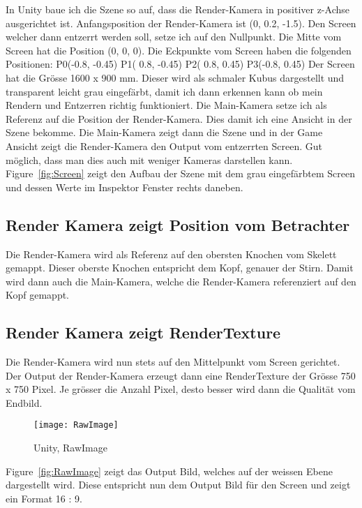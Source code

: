 In Unity baue ich die Szene so auf, dass die Render-Kamera in positiver z-Achse ausgerichtet ist. Anfangsposition der Render-Kamera ist (0, 0.2, -1.5). Den Screen welcher dann entzerrt werden soll, setze ich auf den Nullpunkt. Die Mitte vom Screen hat die Position (0, 0, 0).
Die Eckpunkte vom Screen haben die folgenden Positionen: 
P0(-0.8, -0.45)
P1( 0.8, -0.45)
P2( 0.8,  0.45)
P3(-0.8,  0.45)
Der Screen hat die Grösse 1600 x 900 mm. Dieser wird als schmaler Kubus dargestellt und transparent leicht grau eingefärbt, damit ich dann erkennen kann ob mein Rendern und Entzerren richtig funktioniert.
Die Main-Kamera setze ich als Referenz auf die Position der Render-Kamera. Dies damit ich eine Ansicht in der Szene bekomme. Die Main-Kamera zeigt dann die Szene und in der Game Ansicht zeigt die Render-Kamera den Output vom entzerrten Screen.  
Gut möglich, dass man dies auch mit weniger Kameras darstellen kann. \\ Figure~\ref{fig:Screen} zeigt den Aufbau der Szene mit dem grau eingefärbtem Screen und dessen Werte im Inspektor Fenster rechts daneben.

\subsection{Render Kamera zeigt Position vom Betrachter}
Die Render-Kamera wird als Referenz auf den obersten Knochen vom Skelett gemappt. Dieser oberste Knochen entspricht dem Kopf, genauer der Stirn.
Damit wird dann auch die Main-Kamera, welche die Render-Kamera referenziert auf den Kopf gemappt.

\subsection{Render Kamera zeigt RenderTexture}
Die Render-Kamera wird nun stets auf den Mittelpunkt vom Screen gerichtet. Der Output der Render-Kamera erzeugt dann eine RenderTexture der Grösse 750 x 750 Pixel. Je grösser die Anzahl Pixel, desto besser wird dann die Qualität vom Endbild.

\begin{figure}[H]
	\texttt{[image: RawImage]}
	\caption{Unity, RawImage}
	\label{fig:Rawimage}
\end{figure}

Figure~\ref{fig:RawImage} zeigt das Output Bild, welches auf der weissen Ebene dargestellt wird. Diese entspricht nun dem Output Bild für den Screen und zeigt ein Format 16 : 9.


